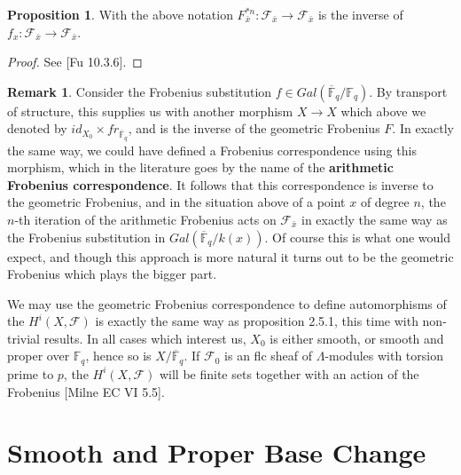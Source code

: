 \documentclass{ucbthesis}
\theoremstyle{definition}
\newtheorem{rmk}[thm]{Remark}
\theoremstyle{theorem}
\newtheorem{prop}[thm]{Proposition}
\begin{document}
\begin{prop}
With the above notation $F^{*n}_{\bar{x}}:\mathcal{F}_{\bar{x}} \rightarrow \mathcal{F}_{\bar{x}}$ is the inverse of $f_{x}: \mathcal{F}_{\bar{x}} \rightarrow \mathcal{F}_{\bar{x}}$. 
\end{prop}

\begin{proof}
See [Fu 10.3.6].
\end{proof}

\begin{rmk}
Consider the Frobenius substitution $f\in Gal(\overline{\mathbb{F}}_{q}/\mathbb{F}_{q})$. By transport of
 structure, this supplies us with another morphism $X\rightarrow X$ which above we denoted by $id_{X_0}\times
  fr_{\overline{\mathbb{F}}_{q}}$, and is the inverse of the geometric Frobenius $F$. In exactly the same 
  way, we could have defined a Frobenius correspondence using this morphism, which in the literature goes by 
  the name of the \textbf{arithmetic Frobenius correspondence}. It follows that this correspondence is 
  inverse to the geometric Frobenius, and in the situation above of a point $x$ of degree $n$, the $n$-th 
  iteration of the arithmetic Frobenius acts on $\mathcal{F}_{\bar{x}}$ in exactly the same way as the 
  Frobenius substitution in $Gal(\overline{\mathbb{F}}_{q}/k(x))$. Of course this is what one would expect, 
  and though this approach is more natural it turns out to be the geometric Frobenius which plays the bigger 
  part. 
\end{rmk}

We may use the geometric Frobenius correspondence to define automorphisms of the $H^{i}(X,\mathcal{F})$ is exactly the same way as proposition 2.5.1, this time with non-trivial results. In all cases which interest us, $X_{0}$ is either smooth, or smooth and proper over $\mathbb{F}_{	q}$, hence so is $X/\overline{\mathbb{F}}_{q}$. If $\mathcal{F}_{0}$ is an flc sheaf of $\Lambda$-modules with torsion prime to $p$, the $H^{i}(X,\mathcal{F})$ will be finite sets together with an action of the Frobenius [Milne EC VI 5.5].


\section{Smooth and Proper Base Change}
\end{document}
